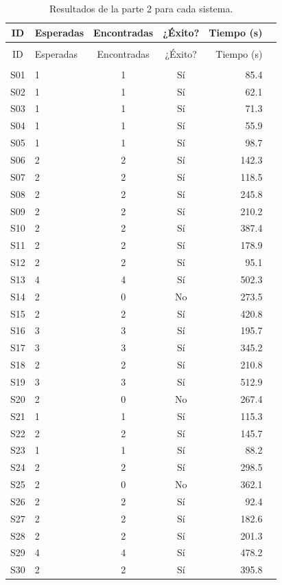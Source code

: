 \documentclass[12pt,a4paper]{article} \usepackage[utf8]{inputenc} \usepackage[spanish]{babel} \usepackage{amsmath, amssymb, amsthm} \usepackage{bm} \usepackage{float} \usepackage{longtable} \usepackage[hidelinks]{hyperref}
\begin{document}
\begin{longtable}{clccrc}
\caption{Resultados de la parte 2 para cada sistema.} \label{tab:resultados_sistemas} \\
\hline ID & Esperadas & Encontradas & ¿Éxito? & Tiempo (s) \\
\hline \endfirsthead \multicolumn{5}{c}{\textit{}} \\
\hline ID & Esperadas & Encontradas & ¿Éxito? & Tiempo (s) \\
\hline \endhead \hline \multicolumn{5}{r}{} \\
\endfoot \hline \endlastfoot S01 & 1 & 1 & Sí & 85.4 \\
S02 & 1 & 1 & Sí & 62.1 \\
S03 & 1 & 1 & Sí & 71.3 \\
S04 & 1 & 1 & Sí & 55.9 \\
S05 & 1 & 1 & Sí & 98.7 \\
S06 & 2 & 2 & Sí & 142.3 \\
S07 & 2 & 2 & Sí & 118.5 \\
S08 & 2 & 2 & Sí & 245.8 \\
S09 & 2 & 2 & Sí & 210.2 \\
S10 & 2 & 2 & Sí & 387.4 \\
S11 & 2 & 2 & Sí & 178.9 \\
S12 & 2 & 2 & Sí & 95.1 \\
S13 & 4 & 4 & Sí & 502.3 \\
S14 & 2 & 0 & No & 273.5 \\
S15 & 2 & 2 & Sí & 420.8 \\
S16 & 3 & 3 & Sí & 195.7 \\
S17 & 3 & 3 & Sí & 345.2 \\
S18 & 2 & 2 & Sí & 210.8 \\
S19 & 3 & 3 & Sí & 512.9 \\
S20 & 2 & 0 & No & 267.4 \\
S21 & 1 & 1 & Sí & 115.3 \\
S22 & 2 & 2 & Sí & 145.7 \\
S23 & 1 & 1 & Sí & 88.2 \\
S24 & 2 & 2 & Sí & 298.5 \\
S25 & 2 & 0 & No & 362.1 \\
S26 & 2 & 2 & Sí & 92.4 \\
S27 & 2 & 2 & Sí & 182.6 \\
S28 & 2 & 2 & Sí & 201.3 \\
S29 & 4 & 4 & Sí & 478.2 \\
S30 & 2 & 2 & Sí & 395.8 \\
\end{longtable}
\end{document}
